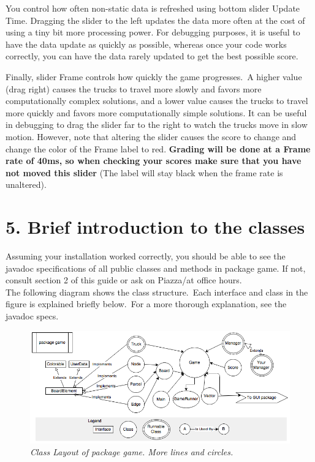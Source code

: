 \documentclass[11pt]{article}
\begin{document}
You control how often non-static data is refreshed using bottom slider Update Time. Dragging the slider to the left updates the data more often at the cost of using a tiny bit more processing 
power. For debugging purposes, it is useful to have the data update as quickly as possible, whereas once your code works correctly, you can have the data rarely updated to get the best possible score.

Finally, slider Frame controls how quickly the game progresses.\ A higher value (drag right) causes the trucks to travel more slowly and favors more computationally complex solutions, and a lower value causes the trucks to travel more quickly and favors more computationally simple solutions. It can be useful in debugging to drag the slider far to the right to watch the trucks move in slow motion. However, note that altering the slider causes the score to change and change the color of the Frame label to red. \textbf{Grading will be done at a Frame rate of 40ms, so when checking your scores make sure that you have not moved this slider} (The label will stay black when the frame rate is unaltered).

\section{5. Brief introduction to the classes}
Assuming your installation worked correctly, you should be able to see the javadoc specifications of all public classes and methods in package game.
If not, consult section 2 of this guide or ask on Piazza/at office hours.\\

The following diagram shows the class structure.\ Each interface and class in the figure is explained briefly below.\ For a more thorough explanation, see the javadoc specs.
\begin{figure}[h]
\centerline{\includegraphics[scale=0.5]{hirearchy.png}} 
\caption{\em{Class Layout of package game. More lines and circles.}}
\end{figure}
\end{document}
